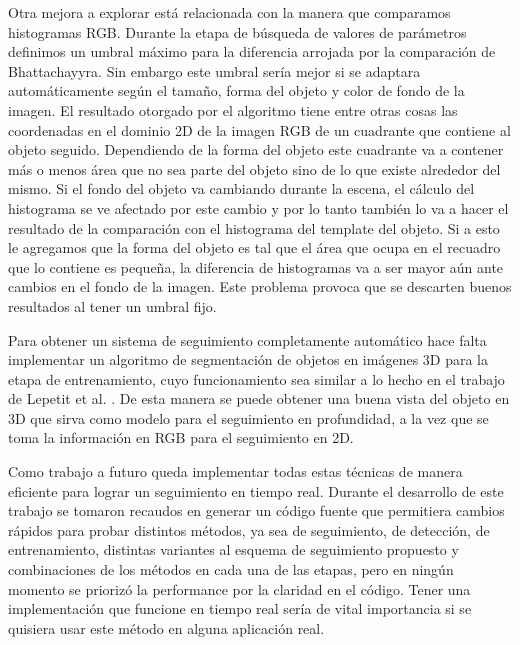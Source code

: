Otra mejora a explorar está relacionada con la manera que comparamos histogramas RGB. Durante la etapa de búsqueda de valores de parámetros definimos un umbral máximo para la diferencia arrojada por la comparación de Bhattachayyra. Sin embargo este umbral sería mejor si se adaptara automáticamente según el tamaño, forma del objeto y color de fondo de la imagen. El resultado otorgado por el algoritmo tiene entre otras cosas las coordenadas en el dominio 2D de la imagen RGB de un cuadrante que contiene al objeto seguido. Dependiendo de la forma del objeto este cuadrante va a contener más o menos área que no sea parte del objeto sino de lo que existe alrededor del mismo. Si el fondo del objeto va cambiando durante la escena, el cálculo del histograma se ve afectado por este cambio y por lo tanto también lo va a hacer el resultado de la comparación con el histograma del template del objeto. Si a esto le agregamos que la forma del objeto es tal que el área que ocupa en el recuadro que lo contiene es pequeña, la diferencia de histogramas va a ser mayor aún ante cambios en el fondo de la imagen. Este problema provoca que se descarten buenos resultados al tener un umbral fijo.

Para obtener un sistema de seguimiento completamente automático hace falta implementar un algoritmo de segmentación de objetos en imágenes 3D para la etapa de entrenamiento, cuyo funcionamiento sea similar a lo hecho en el trabajo de Lepetit et al. \cite{park2011texture}. De esta manera se puede obtener una buena vista del objeto en 3D que sirva como modelo para el seguimiento en profundidad, a la vez que se toma la información en RGB para el seguimiento en 2D.

Como trabajo a futuro queda implementar todas estas técnicas de manera eficiente para lograr un seguimiento en tiempo real. Durante el desarrollo de este trabajo se tomaron recaudos en generar un código fuente que permitiera cambios rápidos para probar distintos métodos, ya sea de seguimiento, de detección, de entrenamiento, distintas variantes al esquema de seguimiento propuesto y combinaciones de los métodos en cada una de las etapas, pero en ningún momento se priorizó la performance por la claridad en el código. Tener una implementación que funcione en tiempo real sería de vital importancia si se quisiera usar este método en alguna aplicación real.
